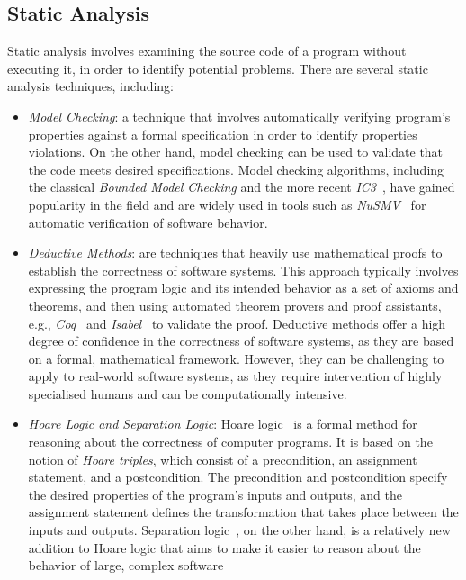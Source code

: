 \subsection{Static Analysis}
Static analysis involves examining the source code of a program without executing it,
in order to identify potential problems.
There are several static analysis techniques, including:
\begin{itemize}
  \item \emph{Model Checking}: a technique that involves automatically
  verifying program's properties against a formal specification in order to
  identify properties violations. On the other hand, model checking can be used
  to validate that the code meets desired specifications. Model checking algorithms,
  including the classical \emph{Bounded Model Checking}\cite{Clarke1999BoundedMC} and the more recent
  \emph{IC3}~\cite{bradley2012understanding}, have gained popularity in the field and
  are widely used in tools such as \emph{NuSMV}~\cite{cavada2014nuxmv} for automatic
  verification of software behavior.
  \item \emph{Deductive Methods}: are techniques that heavily use mathematical proofs
  to establish the correctness of software systems. This approach typically involves
  expressing the program logic and its intended behavior as a set of axioms and theorems,
  and then using automated theorem provers and proof assistants, e.g.,
  \emph{Coq}~\cite{bertot2013interactive} and \emph{Isabel}~\cite{Nipkow2002Isabelle} to validate the proof.
  Deductive methods offer a high degree of confidence in the correctness of
  software systems, as they are based on a formal, mathematical framework.
  However, they can be challenging to apply to real-world software systems, as they
  require intervention of highly specialised humans and can be computationally intensive.
  \item \emph{Hoare Logic and Separation Logic}: Hoare logic~\cite{hoare1969axiomatic} is a formal method
  for reasoning about the correctness of computer programs. It is based on the notion of \emph{Hoare triples}, which consist of a
  precondition, an assignment statement, and a postcondition. The precondition
  and postcondition specify the desired properties of the program's inputs and
  outputs, and the assignment statement defines the transformation that takes
  place between the inputs and outputs.
  Separation logic~\cite{reynolds2002separation}, on the other hand, is a relatively new addition to Hoare logic
  that aims to make it easier to reason about the behavior of large, complex software

\end{itemize}
